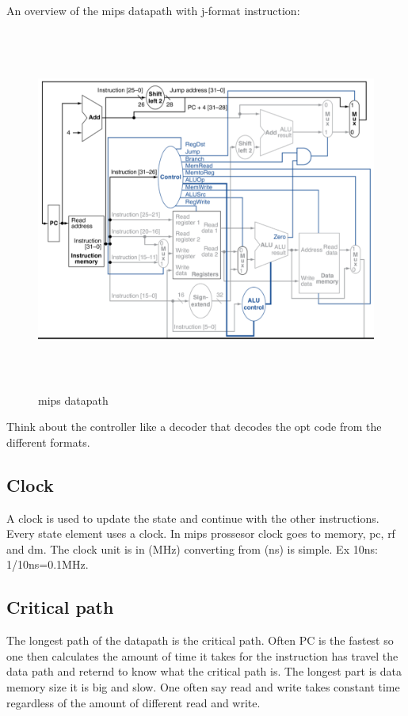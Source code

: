 \newpage

An overview of the mips datapath with j-format instruction:
\begin{figure}[h]
    \vspace{10mm}
    \centering
    \includegraphics[width=16cm, height=12cm]{image/mips-datapath.png} 
    \caption{mips datapath}
    \label{mips-datapath}
\end{figure}

Think about the controller like a decoder that decodes the opt code from the different formats.

\newpage

\subsection{Clock}
A clock is used to update the state and continue with the other instructions. Every state element uses
a clock. In mips prossesor clock goes to memory, pc, rf and dm. The clock unit is in (MHz) converting
from (ns) is simple. Ex 10ns: 1/10ns=0.1MHz.

\subsection{Critical path}
The longest path of the datapath is the critical path. Often PC is the fastest so one then calculates the
amount of time it takes for the instruction has travel the data path and reternd to know what the
critical path is. The longest part is data memory size it is big and slow. One often say read and write
takes constant time regardless of the amount of different read and write.


